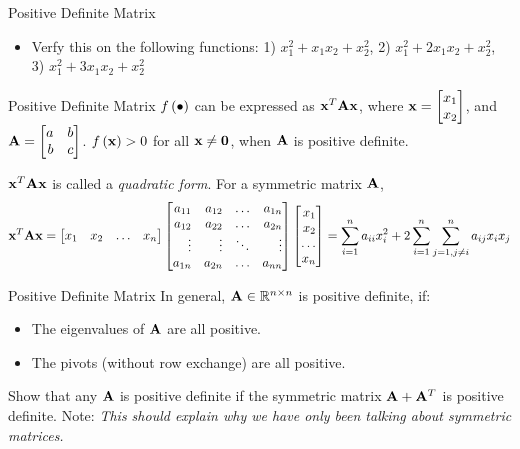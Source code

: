 \documentclass[aspectratio=169]{beamer}
\let\olditem\item
\renewcommand{\item}{\setlength{\itemsep}{\fill}\olditem}
\def\mf{\ensuremath\mathbf}
\def\mb{\ensuremath\mathbb}
\def\lp{\ensuremath\left(}
\def\rp{\ensuremath\right)}
\def\bmx{\ensuremath\begin{bmatrix*}[r]}
\def\emx{\ensuremath\end{bmatrix*}}
\begin{document}
\begin{frame}[t]{Positive Definite Matrix}
\begin{itemize}
    \item Verfy this on the following functions: 1) $x_1^2 + x_1x_2 + x_2^2$,\hspace{0.1cm} 2) $x_1^2 + 2x_1x_2 + x_2^2$,\hspace{0.1cm} 3) $x_1^2 + 3x_1x_2 + x_2^2$
\end{itemize}
\end{frame}


\begin{frame}[t]{Positive Definite Matrix}
\vspace{-0.3cm}
$f\lp\bullet\rp$ can be expressed as $\mf{x}^T\mf{A}\mf{x}$, where $\mf{x} = \bmx x_1\\x_2 \emx$, and $\mf{A} = \bmx a & b\\b & c \emx$. $f\lp \mf{x}\rp > 0$ for all $\mf{x} \neq \mf{0}$, when $\mf{A}$ is positive definite.
\vspace{0.2cm}

$\mf{x}^T\mf{A}\mf{x}$ is called a \textit{quadratic form}. For a symmetric matrix $\mf{A}$,
\[ \mf{x}^T\mf{A}\mf{x} = \bmx
x_{1} & x_{2} & \ldots & x_{n}
\emx \bmx
a_{11} & a_{12} & \ldots & a_{1n}\\
a_{12} & a_{22} & \ldots & a_{2n}\\
\vdots & \vdots & \ddots & \vdots\\
a_{1n} & a_{2n} & \ldots & a_{nn}
\emx \bmx
x_{1} \\ x_{2} \\ \ldots \\ x_{n}
\emx = \sum_{i=1}^na_{ii}x_i^2 + 2\sum_{i=1}^n\sum_{j=1, j \neq i}^n a_{ij}x_ix_j \]
\end{frame}


\begin{frame}[t]{Positive Definite Matrix}
In general, $\mf{A} \in \mb{R}^{n \times n}$ is positive definite, if:
\begin{itemize}
    \item The eigenvalues of $\mf{A}$ are all positive. \vspace{-2cm}
    \item The pivots (without row exchange) are all positive.
\end{itemize}
\vspace{2cm}

Show that any $\mf{A}$ is positive definite if the symmetric matrix $\mf{A} + \mf{A}^T$ is positive definite. Note: \textit{This should explain why we have only been talking about symmetric matrices.}
\end{frame}
\end{document}
